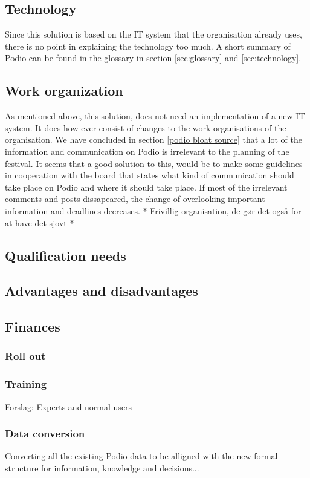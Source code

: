 \subsection{Technology}
Since this solution is based on the IT system that the organisation already uses, there is no point
in explaining the technology too much. A short summary of Podio can be found in the glossary in
section \ref{sec:glossary} and \ref{sec:technology}.

\subsection{Work organization}
As mentioned above, this solution, does not need an implementation of a new IT system. It does how
ever consist of changes to the work organisations of the organisation. 
We have concluded in section \ref{podio bloat source} that a lot of the information and
communication on Podio is irrelevant to the planning of the festival. It seems that a good solution
to this, would be to make some guidelines in cooperation with the board that states what kind of
communication should take place on Podio and where it should take place. If most of the irrelevant
comments and posts dissapeared, the change of overlooking important information and deadlines
decreases. 
* Frivillig organisation, de gør det også for at have det sjovt
* 

\subsection{Qualification needs}

\subsection{Advantages and disadvantages}

\subsection{Finances}

\subsubsection{Roll out}

\subsubsection{Training}
Forslag: Experts and normal users
\subsubsection{Data conversion}
Converting all the existing Podio data to be alligned with the new formal structure for information, knowledge and decisions...

